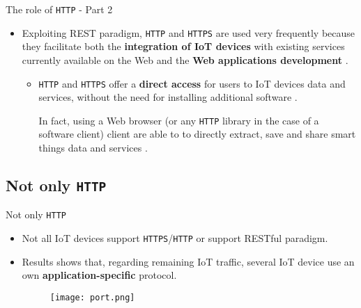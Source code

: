 \documentclass[13.5pt]{beamer}
\begin{document}
\begin{frame}{The role of \texttt{HTTP} - Part 2}

\begin{itemize}
\justifying
\item Exploiting REST paradigm, \texttt{HTTP} and \texttt{HTTPS} are used very frequently because they facilitate both the \textbf{integration of IoT devices} with existing services currently available on the Web and the \textbf{Web applications development} \cite{IOTCITY}\cite{WOT}.

\begin{itemize}
\item \texttt{HTTP} and \texttt{HTTPS} offer a \textbf{direct access} for users to IoT devices data and services, without the need for installing additional software \cite{IOTCITY}.

In fact, using a Web browser (or any \texttt{HTTP} library in the case of a software client) client are able to to directly extract, save and share smart things data and services \cite{WOT}.
\end{itemize}
\end{itemize}

\end{frame} 
\subsection{Not only \texttt{HTTP}}
\begin{frame}{Not only \texttt{HTTP}}

\begin{itemize}
\item Not all IoT devices support \texttt{HTTPS}/\texttt{HTTP} or support RESTful paradigm. 

\item Results shows that, regarding remaining IoT traffic, several IoT device use an own \textbf{application-specific} protocol. 

\begin{figure}
  \texttt{[image: port.png]}
\end{figure}

\end{itemize}


\end{frame} 
\end{document}
